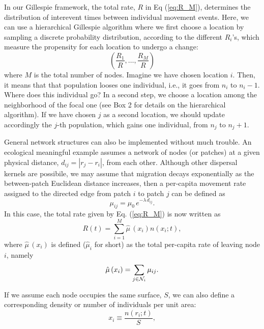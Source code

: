 In our Gillespie framework, the total rate, $R$ in Eq (\ref{eq:R_M}), determines the distribution of interevent times between individual movement events. Here, we can use a hierarchical Gillespie algorithm where we first choose a location by sampling a discrete probability distribution, according to the different $R_i$'s, which measure the propensity for each location to undergo a change:
\begin{equation}
\left(\frac{R_1}{R}, \dots, \frac{R_M}{R}\right)
\end{equation}
where $M$ is the total number of nodes. Imagine we have chosen location $i$. Then, it means that that population looses one individual, i.e., it goes from $n_i$ to $n_i-1$. Where does this individual go? In a second step, we choose a location among the neighborhood of the focal one (see Box 2 for details on the hierarchical algorithm). If we have chosen $j$ as a second location, we should update accordingly the $j$-th population, which gains one individual, from $n_j$ to $n_j+1$. 
\smallskip

General network structures can also be implemented without much trouble. An ecological meaningful example assumes a network of nodes (or patches) at a given physical distance, $d_{ij} =|r_j -r_i|$, from each other. Although other dispersal kernels are possibile, we may assume that migration decays exponentially as the between-patch Euclidean distance increases, then a per-capita movement rate assigned to the directed edge from patch $i$ to patch $j$ can be defined as
\begin{equation}
\mu_{ij} = \mu_0 \, e^{-\lambda\,d_{ij}}. \nonumber
\end{equation}
In this case, the total rate given by Eq. (\ref{eq:R_M}) is now written as
\begin{equation}
R(t) = \sum_{i=1}^{M} \hat{\mu}\,(x_i) n(x_i;t),
\label{eq:R_MM}
\end{equation}
where $\hat{\mu}\,(x_i)$ is defined ($\hat{\mu}_i$ for short) as the total per-capita rate of leaving node $i$, namely  
\begin{equation}
\hat{\mu}\,(x_i) = \sum_{j \in {\cal N}_i} \mu_{ij}.
\end{equation}   

If we assume each node occupies the same surface, $S$, we can also define a corresponding density or number of individuals per unit area:   
\begin{equation}
x_i \equiv \frac{n(r_i;t)}{S},
\label{eq:x_i}
\end{equation}

